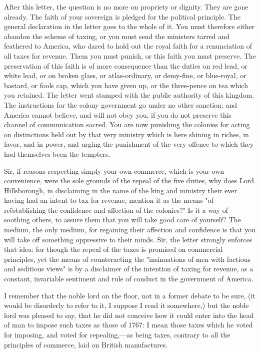 After this letter, the question is no more on propriety or dignity. They are gone already. The faith of your sovereign is pledged for the political principle. The general declaration in the letter goes to the whole of it. You must therefore either abandon the scheme of taxing, or you must send the ministers tarred and feathered to America, who dared to hold out the royal faith for a renunciation of all taxes for revenue. Them you must punish, or this faith you must preserve. The preservation of this faith is of more consequence than the duties on red lead, or white lead, or on broken glass, or atlas-ordinary, or demy-fine, or blue-royal, or bastard, or fools cap, which you have given up, or the three-pence on tea which you retained. The letter went stamped with the public authority of this kingdom. The instructions for the colony government go under no other sanction; and America cannot believe, and will not obey you, if you do not preserve this channel of communication sacred. You are now punishing the colonies for acting on distinctions held out by that very ministry which is here shining in riches, in favor, and in power, and urging the punishment of the very offence to which they had themselves been the tempters.

Sir, if reasons respecting simply your own commerce, which is your own convenience, were the sole grounds of the repeal of the five duties, why does Lord Hillsborough, in disclaiming in the name of the king and ministry their ever having had an intent to tax for revenue, mention it as the means "of reëstablishing the confidence and affection of the colonies?" Is it a way of soothing others, to assure them that you will take good care of yourself? The medium, the only medium, for regaining their affection and confidence is that you will take off something oppressive to their minds. Sir, the letter strongly enforces that idea: for though the repeal of the taxes is promised on commercial principles, yet the means of counteracting the "insinuations of men with factious and seditious views" is by a disclaimer of the intention of taxing for revenue, as a constant, invariable sentiment and rule of conduct in the government of America.

I remember that the noble lord on the floor, not in a former debate to be sure, (it would be disorderly to refer to it, I suppose I read it somewhere,) but the noble lord was pleased to say, that he did not conceive how it could enter into the head of man to impose such taxes as those of 1767: I mean those taxes which he voted for imposing, and voted for repealing,—as being taxes, contrary to all the principles of commerce, laid on British manufactures.

